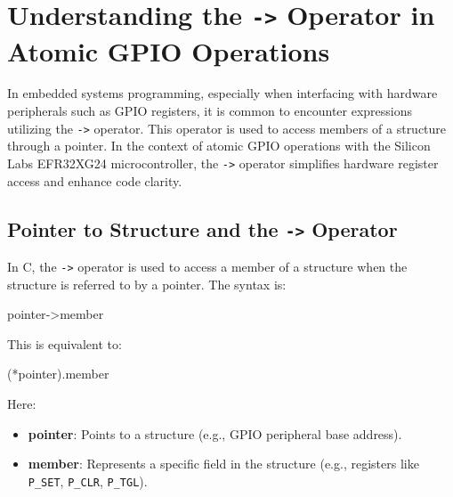 \documentclass[
  9pt,
  letterpaper,
  abstract,
  titlepage]{scrbook}
\newenvironment{Shaded}{\begin{snugshade}}{\end{snugshade}}
\newcommand{\NormalTok}[1]{\textcolor[rgb]{0.00,0.23,0.31}{#1}}
\newcommand{\OperatorTok}[1]{\textcolor[rgb]{0.37,0.37,0.37}{#1}}
\begin{document}
\section{\texorpdfstring{Understanding the \texttt{-\textgreater{}}
Operator in Atomic GPIO
Operations}{Understanding the -\textgreater{} Operator in Atomic GPIO Operations}}\label{understanding-the---operator-in-atomic-gpio-operations}

In embedded systems programming, especially when interfacing with
hardware peripherals such as GPIO registers, it is common to encounter
expressions utilizing the \texttt{-\textgreater{}} operator. This
operator is used to access members of a structure through a pointer. In
the context of atomic GPIO operations with the Silicon Labs EFR32XG24
microcontroller, the \texttt{-\textgreater{}} operator simplifies
hardware register access and enhance code clarity.

\subsection{\texorpdfstring{Pointer to Structure and the
\texttt{-\textgreater{}}
Operator}{Pointer to Structure and the -\textgreater{} Operator}}\label{pointer-to-structure-and-the---operator}

In C, the \texttt{-\textgreater{}} operator is used to access a member
of a structure when the structure is referred to by a pointer. The
syntax is:

\begin{Shaded}
\begin{Highlighting}[]
\NormalTok{pointer}\OperatorTok{{-}\textgreater{}}\NormalTok{member}
\end{Highlighting}
\end{Shaded}

This is equivalent to:

\begin{Shaded}
\begin{Highlighting}[]
\OperatorTok{(*}\NormalTok{pointer}\OperatorTok{).}\NormalTok{member}
\end{Highlighting}
\end{Shaded}

Here:

\begin{itemize}
\item
  \textbf{pointer}: Points to a structure (e.g., GPIO peripheral base
  address).
\item
  \textbf{member}: Represents a specific field in the structure (e.g.,
  registers like \texttt{P\_SET}, \texttt{P\_CLR}, \texttt{P\_TGL}).
\end{itemize}
\end{document}
